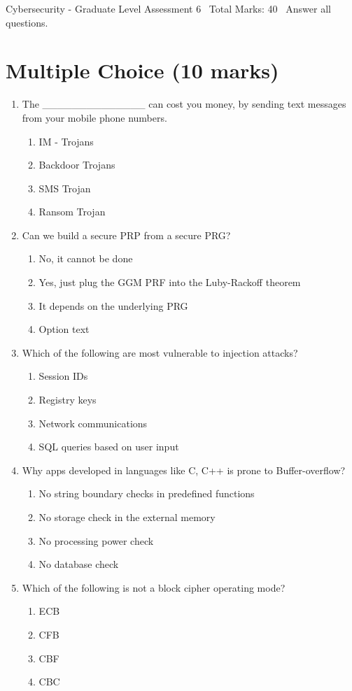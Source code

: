 \documentclass[12pt]{article}
\begin{document}
\begin{center}
Cybersecurity - Graduate Level Assessment 6 \
Total Marks: 40 \
Answer all questions.
\end{center}

\section*{Multiple Choice (10 marks)}
\begin{enumerate}[label=\arabic*.]
\item The \_\_\_\_\_\_\_\_\_\_\_\_\_\_ can cost you money, by sending text messages from your mobile phone numbers.
\begin{enumerate}[label=(\alph*)]
    \item IM - Trojans
    \item Backdoor Trojans
    \item SMS Trojan
    \item Ransom Trojan
\end{enumerate}
\item Can we build a secure PRP from a secure PRG?
\begin{enumerate}[label=(\alph*)]
    \item No, it cannot be done
    \item Yes, just plug the GGM PRF into the Luby-Rackoff theorem
    \item It depends on the underlying PRG
    \item Option text
\end{enumerate}
\item Which of the following are most vulnerable to injection attacks?
\begin{enumerate}[label=(\alph*)]
    \item Session IDs
    \item Registry keys
    \item Network communications
    \item SQL queries based on user input
\end{enumerate}
\item Why apps developed in languages like C, C++ is prone to Buffer-overflow?
\begin{enumerate}[label=(\alph*)]
    \item No string boundary checks in predefined functions
    \item No storage check in the external memory
    \item No processing power check
    \item No database check
\end{enumerate}
\item Which of the following is not a block cipher operating mode?
\begin{enumerate}[label=(\alph*)]
    \item ECB
    \item CFB
    \item CBF
    \item CBC
\end{enumerate}
\end{enumerate}
\end{document}
